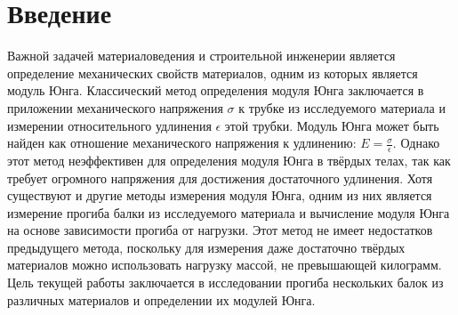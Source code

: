 \documentclass[12pt]{article}
\begin{document}
\section{Введение}
Важной задачей материаловедения и строительной инженерии является определение механических свойств материалов, 
одним из которых является модуль Юнга. Классический метод определения модуля Юнга заключается в приложении механического напряжения $\sigma$
к трубке из исследуемого материала и измерении относительного удлинения $\epsilon$ этой трубки. Модуль Юнга может быть найден как отношение 
механического напряжения к удлинению: $E = \frac{\sigma}{\epsilon}$. Однако этот метод неэффективен для определения модуля Юнга в твёрдых телах, 
так как требует огромного напряжения для достижения достаточного удлинения. Хотя существуют и другие методы измерения модуля Юнга, 
одним из них является измерение прогиба балки из исследуемого материала и вычисление модуля Юнга на основе зависимости прогиба от нагрузки. 
Этот метод не имеет недостатков предыдущего метода, поскольку для измерения даже достаточно твёрдых материалов можно использовать нагрузку массой, 
не превышающей килограмм. Цель текущей работы заключается в исследовании прогиба нескольких балок из различных материалов и определении их 
модулей Юнга.
\end{document}
